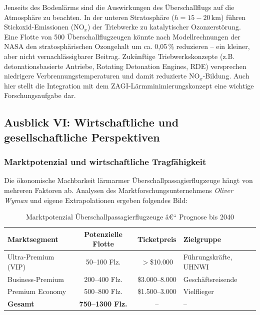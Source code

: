﻿\documentclass[12pt,a4paper]{article}
\theoremstyle{definition}
\theoremstyle{remark}
\begin{document}
Jenseits des Bodenlärms sind die Auswirkungen des Überschallflugs auf die Atmosphäre
zu beachten. In der unteren Stratosphäre ($h = 15{-}20\,\text{km}$) führen
Stickoxid-Emissionen (NO$_x$) der Triebwerke zu katalytischer Ozonzerstörung.
Eine Flotte von 500 Überschallflugzeugen könnte nach Modellrechnungen der NASA den
stratosphärischen Ozongehalt um ca. 0,05\,\% reduzieren -- ein kleiner, aber nicht
vernachlässigbarer Beitrag. Zukünftige Triebwerkskonzepte (z.B. detonationsbasierte
Antriebe, Rotating Detonation Engines, RDE) versprechen niedrigere
Verbrennungstemperaturen und damit reduzierte NO$_x$-Bildung. Auch hier stellt
die Integration mit dem ZAGI-Lärmminimierungskonzept eine wichtige
Forschungsaufgabe dar.

\subsection{Ausblick VI: Wirtschaftliche und gesellschaftliche Perspektiven}
\label{sec:ausblick_wirtschaft}

\subsubsection{Marktpotenzial und wirtschaftliche Tragfähigkeit}

Die ökonomische Machbarkeit lärmarmer Überschallpassagierflugzeuge hängt von mehreren
Faktoren ab. Analysen des Marktforschungsunternehmens \emph{Oliver Wyman} und eigene
Extrapolationen ergeben folgendes Bild:

\begin{table}[H]
  \centering
  \caption{Marktpotenzial Überschallpassagierflugzeuge â€“ Prognose bis 2040}
  \label{tab:markt}
  \begin{tabular}{lccl}
    \toprule
    Marktsegment & Potenzielle Flotte & Ticketpreis & Zielgruppe \\
    \midrule
    Ultra-Premium (VIP) & 50--100 Flz. & $>$\$10.000 & Führungskräfte, UHNWI \\
    Business-Premium & 200--400 Flz. & \$3.000--8.000 & Geschäftsreisende \\
    Premium Economy & 500--800 Flz. & \$1.500--3.000 & Vielflieger \\
    \textbf{Gesamt} & \textbf{750--1300 Flz.} & -- & -- \\
    \bottomrule
  \end{tabular}
\end{table}
\end{document}
